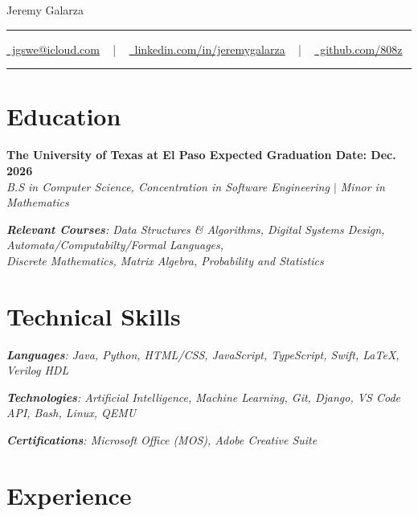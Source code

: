 \documentclass[letterpaper,10pt]{article}
\newcommand{\documentTitle}[2]{
  \begin{center}
    {\Huge\color{accentTitle} #1}
    \vspace{10pt}
    {\color{accentLine} \hrule}
    \vspace{2pt}
    \footnotesize{#2}
    \vspace{2pt}
    {\color{accentLine} \hrule}
  \end{center}
}
\newcommand{\heading}[2]{
  \hspace{10pt}#1\hfill#2\\
}
\newcommand{\headingBf}[2]{
  \heading{\textbf{#1}}{\textbf{#2}}
}
\newcommand{\headingIt}[2]{
  \heading{\textit{#1}}{\textit{#2}}
}
\begin{document}

  \documentTitle{Jeremy Galarza}{
    \href{mailto:jgswe@icloud.com}{
      \raisebox{-0.15\height} \faEnvelope\ jgswe@icloud.com} ~ | ~
    \href{https://www.linkedin.com/in/jeremygalarza}{
      \raisebox{-0.15\height} \faLinkedin\ linkedin.com/in/jeremygalarza}  ~ | ~
    \href{https://www.github.com/808z}{
      \raisebox{-0.15\height} \faGithub\ github.com/808z}
  }


\vspace{0pt}
  \section{Education}
  \headingBf{The University of Texas at El Paso \hspace{7.5cm}Expected Graduation Date: Dec. 2026}{}
  \headingIt{B.S in Computer Science, Concentration in Software Engineering $|$ Minor in Mathematics \hspace{7.9cm}}{}
  \vspace{3pt}
  \headingIt{\textbf{Relevant Courses}: Data Structures \& Algorithms, Digital Systems Design, Automata/Computabilty/Formal Languages,
  \\\hspace{0.3cm}Discrete Mathematics, Matrix Algebra, Probability and Statistics}{}
  \vspace{-2pt}
  
\vspace{0pt}
  \section{Technical Skills}
    \headingIt{\textbf{Languages}: Java, Python, HTML/CSS, JavaScript, TypeScript, Swift, LaTeX, Verilog HDL}{}
    \vspace{1pt}
    \headingIt{\textbf{Technologies}: Artificial Intelligence, Machine Learning, Git, Django, VS Code API, Bash, Linux, QEMU}{}
    \vspace{2pt}
    \headingIt{\textbf{Certifications}: Microsoft Office (MOS), Adobe Creative Suite }{}
  

\vspace{0pt}
  \section{Experience}
\end{document}

